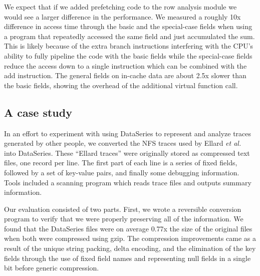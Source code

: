 \documentclass{acm_proc_article-sp}
\begin{document}
We
expect that if we added prefetching code to the row analysis module we
would see a larger difference in the performance. 
We measured a
roughly 10x difference in access time through the basic and the
special-case fields when using a program that repeatedly accessed the
same field and just accumulated the sum.  This is likely because of
the extra branch instructions interfering with the CPU's ability to
fully pipeline the code with the basic fields while the special-case
fields reduce the access down to a single instruction which can be
combined with the add instruction.  The general fields on in-cache
data are about 2.5x slower than the basic fields, showing the overhead
of the additional virtual function call.

\subsection{A case study}\label{sec:ellard}

In an effort to experiment with using DataSeries to represent and
analyze traces generated by other people, we converted the NFS
traces used by Ellard \textit{et al.}~\cite{ellard03} into DataSeries.  
These ``Ellard traces''
were originally stored as compressed text files, one record per line.
The first part of each line is a series of fixed fields, followed by a
set of key-value pairs, and finally some debugging information.  
Tools included a scanning program which reads
trace files and outputs summary information.

Our evaluation consisted of two parts.
First, we wrote a reversible conversion program to
verify that we were properly preserving all of the information.
We found that the DataSeries files were on average 0.77x the size of
the original files when both were compressed using gzip.  The
compression improvements came as a result of the unique string
packing, delta encoding, and the elimination of the key fields through
the use of fixed field names and representing null fields in a single
bit before generic compression.

\end{document}

